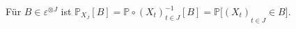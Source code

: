 Für $B \in \varepsilon^{ \otimes J}$ ist ${{\mathbb{P}}_{X_{J}}}[B] = {\mathbb{P} \circ {{(X_{t})}}_{t\in J}^{-1}[B] = \mathbb{P}[(X_{t})}_{t\in J} \in B]$. 